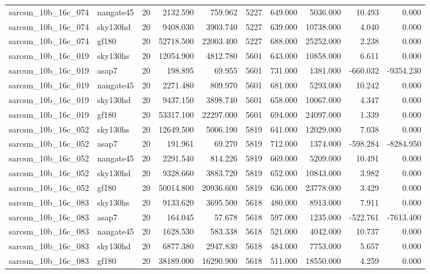 \begin{tabular}{llrrrrrrrr}
sarcsm\_10b\_16c\_074 & nangate45 & 20 & 2132.590 & 759.962 & 5227 & 649.000 & 5036.000 & 10.493 & 0.000 \\
sarcsm\_10b\_16c\_074 & sky130hd & 20 & 9408.030 & 3903.740 & 5227 & 639.000 & 10738.000 & 4.040 & 0.000 \\
sarcsm\_10b\_16c\_074 & gf180 & 20 & 52718.500 & 22003.400 & 5227 & 688.000 & 25252.000 & 2.238 & 0.000 \\
sarcsm\_10b\_16c\_019 & sky130hs & 20 & 12054.900 & 4812.780 & 5601 & 643.000 & 10858.000 & 6.611 & 0.000 \\
sarcsm\_10b\_16c\_019 & asap7 & 20 & 198.895 & 69.955 & 5601 & 731.000 & 1381.000 & -660.032 & -9354.230 \\
sarcsm\_10b\_16c\_019 & nangate45 & 20 & 2271.480 & 809.970 & 5601 & 681.000 & 5293.000 & 10.242 & 0.000 \\
sarcsm\_10b\_16c\_019 & sky130hd & 20 & 9437.150 & 3898.740 & 5601 & 658.000 & 10067.000 & 4.347 & 0.000 \\
sarcsm\_10b\_16c\_019 & gf180 & 20 & 53317.100 & 22297.000 & 5601 & 694.000 & 24097.000 & 1.339 & 0.000 \\
sarcsm\_10b\_16c\_052 & sky130hs & 20 & 12649.500 & 5006.190 & 5819 & 641.000 & 12029.000 & 7.038 & 0.000 \\
sarcsm\_10b\_16c\_052 & asap7 & 20 & 191.961 & 69.270 & 5819 & 712.000 & 1374.000 & -598.284 & -8284.950 \\
sarcsm\_10b\_16c\_052 & nangate45 & 20 & 2291.540 & 814.226 & 5819 & 669.000 & 5209.000 & 10.491 & 0.000 \\
sarcsm\_10b\_16c\_052 & sky130hd & 20 & 9328.660 & 3883.720 & 5819 & 652.000 & 10843.000 & 3.982 & 0.000 \\
sarcsm\_10b\_16c\_052 & gf180 & 20 & 50014.800 & 20936.600 & 5819 & 636.000 & 23778.000 & 3.429 & 0.000 \\
sarcsm\_10b\_16c\_083 & sky130hs & 20 & 9133.620 & 3695.500 & 5618 & 480.000 & 8913.000 & 7.911 & 0.000 \\
sarcsm\_10b\_16c\_083 & asap7 & 20 & 164.045 & 57.678 & 5618 & 597.000 & 1235.000 & -522.761 & -7613.400 \\
sarcsm\_10b\_16c\_083 & nangate45 & 20 & 1628.530 & 583.338 & 5618 & 521.000 & 4042.000 & 10.737 & 0.000 \\
sarcsm\_10b\_16c\_083 & sky130hd & 20 & 6877.380 & 2947.830 & 5618 & 484.000 & 7753.000 & 5.657 & 0.000 \\
sarcsm\_10b\_16c\_083 & gf180 & 20 & 38189.000 & 16290.900 & 5618 & 511.000 & 18550.000 & 4.259 & 0.000 \\

\end{tabular}
